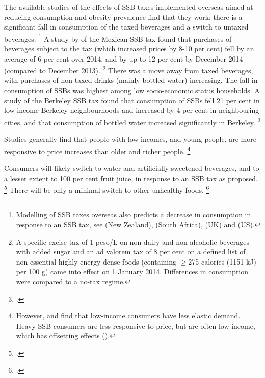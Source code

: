 \documentclass[embargoed]{grattan}
\begin{document}
The available studies of the effects of SSB taxes implemented overseas aimed at reducing consumption and obesity prevalence find that they work: there is a significant fall in consumption of the taxed beverages and a switch to untaxed beverages.%
\footnote{Modelling of SSB taxes overseas also predicts a decrease in consumption in response to an SSB tax, see \textcite{NiMhurchu2014Twentypercenttax} (New Zealand), \textcite{Manyema2014potentialimpact20} (South Africa), \textcite{Briggs2013Overallincomespecific} (UK) and \textcite{Long2015Costeffectivenesssugar} (US).} A study by \textcite{Colchero2016Beveragepurchasesstores} of the Mexican SSB tax found that purchases of beverages subject to the tax (which increased prices by 8-10 per cent) fell by an average of 6 per cent over 2014, and by up to 12 per cent by December 2014 (compared to December 2013).%
\footnote{A specific excise tax of 1 peso/L on non-dairy and non-alcoholic beverages with added sugar and an ad valorem tax of 8 per cent on a defined list of non-essential highly energy dense foods (containing \(\geq\)275 calories (1151 kJ) per 100 g) came into effect on 1 January 2014.
Differences in consumption were compared to a no-tax regime.} There was a move away from taxed beverages, with purchases of non-taxed drinks (mainly bottled water) increasing.
The fall in consumption of SSBs was highest among low socio-economic status households.
A study of the Berkeley SSB tax found that consumption of SSBs fell 21 per cent in low-income Berkeley neighbourhoods and increased by 4 per cent in neighbouring cities, and that consumption of bottled water increased significantly in Berkeley.%
\footcite{Falbe2016ImpactBerkeleyExcise}

Studies generally find that people with low incomes, and young people, are more responsive to price increases than older and richer people.%
\footnote{\textcites{Yang2016child}{Colchero2016Beveragepurchasesstores}{Organization2016FiscalPoliciesDiet}{Batis2016FirstYearEvaluation}{Sharma2014effectstaxingsugarsweetened}{Coalition2016Policybriefcase}{Friedman2012Sugarsweetenedbeverage}{Clements2015PriceElasticitiesFood} However, \textcite{Finkelstein2010EconomicsObesity} and \textcite{Lin2011Measuringweightoutcomes} find that low-income consumers have less elastic demand.
Heavy SSB consumers are less responsive to price, but are often low income, which has offsetting effects (\textcites{Organization2016FiscalPoliciesDiet}{Etile2015DoHighConsumers}).}

Consumers will likely switch to water and artificially sweetened beverages, and to a lesser extent to 100 per cent fruit juice, in response to an SSB tax as proposed.%
\footcites{Finkelstein2013Implicationssugarsweetened}{Colchero2016Beveragepurchasesstores}{LeBodo2016CanadianSodaTax}{Briggs2013Overallincomespecific} There will be only a minimal switch to other unhealthy foods.%
\footcite{Finkelstein2013Implicationssugarsweetened}
\end{document}
